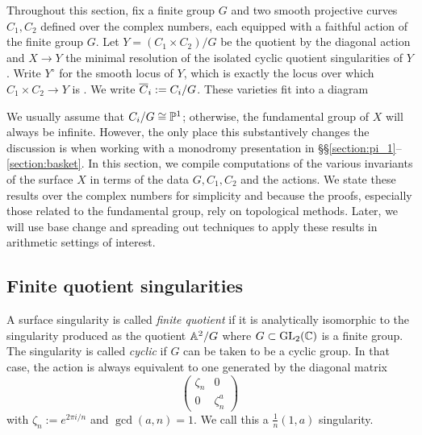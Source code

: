 \documentclass[main.tex]{subfiles}
\begin{document}
Throughout this section, fix a finite group $G$ and two smooth projective curves $C_1, C_2$ defined over the complex numbers, each equipped with a faithful action of the finite group $G$. Let $Y = (C_1 \times C_2) / G$ be the quotient by the diagonal action and $X \to Y$ the minimal resolution of the isolated cyclic quotient singularities of $Y$. Write $Y^{\circ}$ for the smooth locus of $Y$, which is exactly the locus over which $C_1 \times C_2 \to Y$ is \etale. We write $\ol{C}_i := C_i / G$. These varieties fit into a diagram
\begin{center}
\end{center}

We usually assume that $C_i / G \cong \P^1$; otherwise, the fundamental group of $X$ will always be infinite. However, the only place this substantively changes the discussion is when working with a monodromy presentation in \S\S\ref{section:pi_1}--\ref{section:basket}.
In this section, we compile computations of the various invariants of the surface $X$ in terms of the data $G, C_1, C_2$ and the actions. We state these results over the complex numbers for simplicity and because the proofs, especially those related to the fundamental group, rely on topological methods. Later, we will use base change and spreading out techniques to apply these results in arithmetic settings of interest. 


\subsection{Finite quotient singularities} \label{section:quotient_sing}

\begin{defn}
A surface singularity is called \textit{finite quotient} if it is analytically isomorphic to the singularity produced as the quotient $\A^2 / G$ where $G \subset \GL_2(\CC)$ is a finite group. The singularity is called \textit{cyclic} if $G$ can be taken to be a cyclic group. In that case, the action is always equivalent to one generated by the diagonal matrix
\[ 
\begin{pmatrix}
    \zeta_n & 0
    \\
    0 & \zeta_n^a
\end{pmatrix} 
\]
with $\zeta_n := e^{2 \pi i / n}$ and $\gcd(a,n) = 1$. We call this a $\frac{1}{n} (1,a)$ singularity.
\end{defn}
\end{document}
